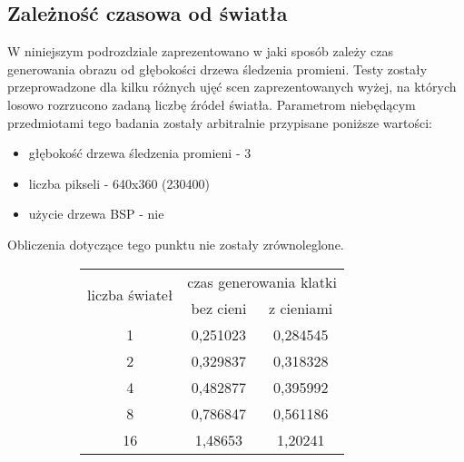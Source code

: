 \subsection{Zależność czasowa od światła}

W niniejszym podrozdziale zaprezentowano w jaki sposób zależy czas generowania obrazu od głębokości drzewa śledzenia promieni. Testy zostały przeprowadzone dla kilku różnych ujęć scen zaprezentowanych wyżej, na których losowo rozrzucono zadaną liczbę źródeł światła. Parametrom niebędącym przedmiotami tego badania zostały arbitralnie przypisane poniższe wartości:

\begin{itemize}

\item głębokość drzewa śledzenia promieni - 3
\item liczba pikseli - 640x360 (230400)
\item użycie drzewa BSP - nie

\end{itemize}

Obliczenia dotyczące tego punktu nie zostały zrównoleglone.

\begin{figure}[!htb]
\advance\leftskip-2cm
\begin{subfigure}{.5\textwidth}
\end{subfigure}
\hspace{2cm}
\begin{subfigure}{.5\textwidth}
		\begin{longtable}{|c|c|c|} \hline
		\multirow{2}{*}{liczba świateł} & \multicolumn{2}{|c|}{czas generowania klatki} \\ \cline{2-3}
	    & bez cieni & z cieniami \\ \hline
	    1 & 0,251023 & 0,284545 \\
	    2 & 0,329837 & 0,318328 \\
		4 & 0,482877 & 0,395992 \\
		8 & 0,786847 & 0,561186 \\
		16 & 1,48653 & 1,20241 \\
		\hline
		\end{longtable}
\end{subfigure}
\end{figure}



